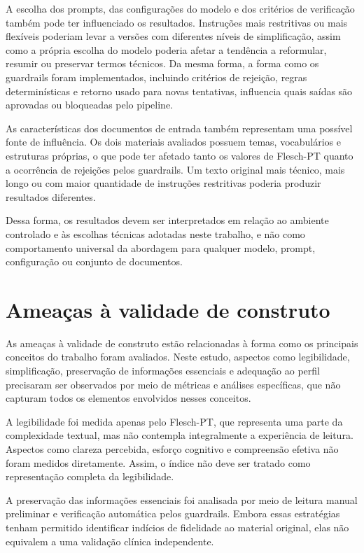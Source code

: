 A escolha dos prompts, das configurações do modelo e dos critérios de verificação também pode ter influenciado os resultados. Instruções mais restritivas ou mais flexíveis poderiam levar a versões com diferentes níveis de simplificação, assim como a própria escolha do modelo poderia afetar a tendência a reformular, resumir ou preservar termos técnicos. Da mesma forma, a forma como os guardrails foram implementados, incluindo critérios de rejeição, regras determinísticas e retorno usado para novas tentativas, influencia quais saídas são aprovadas ou bloqueadas pelo pipeline.

As características dos documentos de entrada também representam uma possível fonte de influência. Os dois materiais avaliados possuem temas, vocabulários e estruturas próprias, o que pode ter afetado tanto os valores de Flesch-PT quanto a ocorrência de rejeições pelos guardrails. Um texto original mais técnico, mais longo ou com maior quantidade de instruções restritivas poderia produzir resultados diferentes.

Dessa forma, os resultados devem ser interpretados em relação ao ambiente controlado e às escolhas técnicas adotadas neste trabalho, e não como comportamento universal da abordagem para qualquer modelo, prompt, configuração ou conjunto de documentos.

\section{Ameaças à validade de construto}
\label{sec:ameacas-validade-construto}

As ameaças à validade de construto estão relacionadas à forma como os principais conceitos do trabalho foram avaliados. Neste estudo, aspectos como legibilidade, simplificação, preservação de informações essenciais e adequação ao perfil precisaram ser observados por meio de métricas e análises específicas, que não capturam todos os elementos envolvidos nesses conceitos.

A legibilidade foi medida apenas pelo Flesch-PT, que representa uma parte da complexidade textual, mas não contempla integralmente a experiência de leitura. Aspectos como clareza percebida, esforço cognitivo e compreensão efetiva não foram medidos diretamente. Assim, o índice não deve ser tratado como representação completa da legibilidade.

A preservação das informações essenciais foi analisada por meio de leitura manual preliminar e verificação automática pelos guardrails. Embora essas estratégias tenham permitido identificar indícios de fidelidade ao material original, elas não equivalem a uma validação clínica independente.


